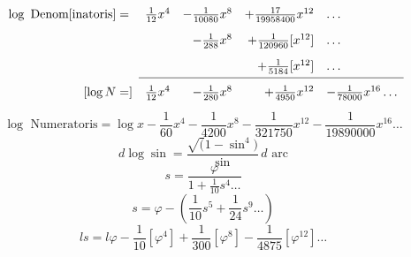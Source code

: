 \fancyhead{}
\noindent{\small [S. 72--73]}
{\small\[\renewcommand{\arraystretch}{1.75}\begin{array}{rrrrl}
\log\text{ Denom[inatoris]}={}&\frac1{12}x^4&-\frac1{10080}x^8&+\frac{17}{19958400}x^{12}&\ldots\\
&&-\frac1{288}x^8&+\frac1{120960}[x^{12}]&\ldots\\
&&&+\frac1{5184}[x^{12}]&\ldots\\\cline{2-5}
[\log N=]&\frac1{12}x^4&-\frac1{280}x^8&+\frac1{4950}x^{12}&-\frac1{78000}x^{16}\ldots
\end{array}\]}
\[\log\text{ Numeratoris}=\log x-\frac1{60}x^4-\frac1{4200}x^8-\frac1{321750}x^{12}-\frac1{19890000}x^{16}\ldots\]
\[d\log\sin=\frac{\surd(1-\sin^4)}{\sin}\,d\text{ arc}\]
\[s=\frac{\varphi}{1+\frac1{10}s^4\ldots}\]
\[s=\varphi-\left(\frac1{10}s^5+\frac1{24}s^9\ldots\right)\]
\[ls=l\varphi-\frac1{10}[\varphi^4]+\frac1{300}[\varphi^8]-\frac1{4875}[\varphi^{12}]\ldots\]
\ClosingRule
\clearpage
\endgroup

